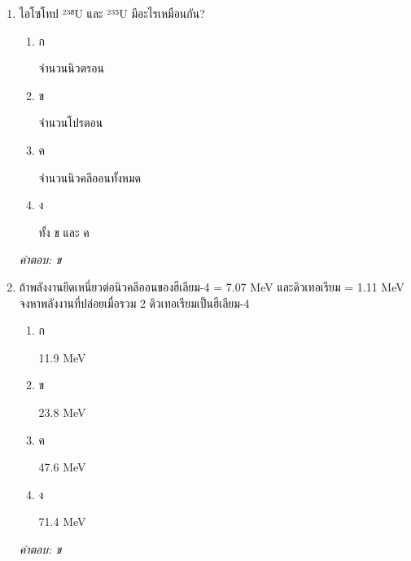 \documentclass[12pt]{article}
\begin{document}
\begin{enumerate}[label=\arabic*., itemsep=0.5\baselineskip, topsep=0.5\baselineskip, leftmargin=*]
\item ไอโซโทป ²³⁸U และ ²³⁵U มีอะไรเหมือนกัน?
\begin{enumerate}[label=\alph*)., itemsep=0.3\baselineskip, topsep=0.3\baselineskip]
\item ก\ 
\begin{minipage}[t]{0.9\linewidth}
\raggedright จำนวนนิวตรอน
\end{minipage}
\item ข\ 
\begin{minipage}[t]{0.9\linewidth}
\raggedright จำนวนโปรตอน
\end{minipage}
\item ค\ 
\begin{minipage}[t]{0.9\linewidth}
\raggedright จำนวนนิวคลีออนทั้งหมด
\end{minipage}
\item ง\ 
\begin{minipage}[t]{0.9\linewidth}
\raggedright ทั้ง ข และ ค
\end{minipage}
\end{enumerate}
\vspace{-0.3\baselineskip}
\begin{small}
\textit{คำตอบ: ข}
\end{small}

\item ถ้าพลังงานยึดเหนี่ยวต่อนิวคลีออนของฮีเลียม-4 = 7.07 MeV และดิวเทอเรียม = 1.11 MeV จงหาพลังงานที่ปล่อยเมื่อรวม 2 ดิวเทอเรียมเป็นฮีเลียม-4
\begin{enumerate}[label=\alph*)., itemsep=0.3\baselineskip, topsep=0.3\baselineskip]
\item ก\ 
\begin{minipage}[t]{0.9\linewidth}
\raggedright 11.9 MeV
\end{minipage}
\item ข\ 
\begin{minipage}[t]{0.9\linewidth}
\raggedright 23.8 MeV
\end{minipage}
\item ค\ 
\begin{minipage}[t]{0.9\linewidth}
\raggedright 47.6 MeV
\end{minipage}
\item ง\ 
\begin{minipage}[t]{0.9\linewidth}
\raggedright 71.4 MeV
\end{minipage}
\end{enumerate}
\vspace{-0.3\baselineskip}
\begin{small}
\textit{คำตอบ: ข}
\end{small}


\end{enumerate}
\end{document}
